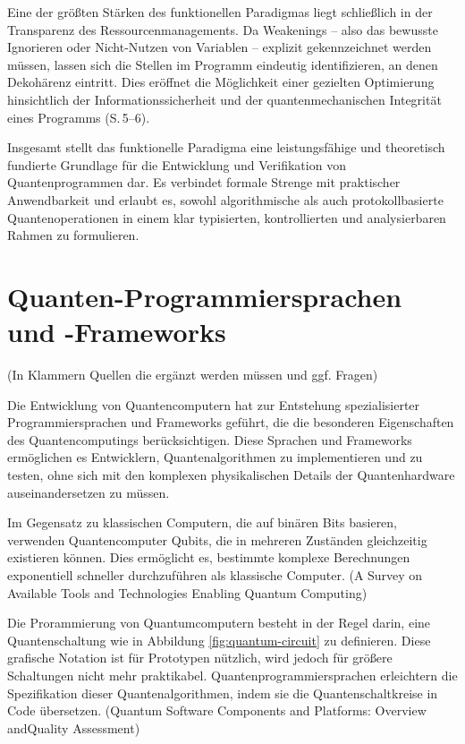Eine der größten Stärken des funktionellen Paradigmas liegt schließlich in der Transparenz des Ressourcenmanagements. Da Weakenings -- also das bewusste Ignorieren oder Nicht-Nutzen von Variablen -- explizit gekennzeichnet werden müssen, lassen sich die Stellen im Programm eindeutig identifizieren, an denen Dekohärenz eintritt. Dies eröffnet die Möglichkeit einer gezielten Optimierung hinsichtlich der Informationssicherheit und der quantenmechanischen Integrität eines Programms (S.\,5--6).

Insgesamt stellt das funktionelle Paradigma eine leistungsfähige und theoretisch fundierte Grundlage für die Entwicklung und Verifikation von Quantenprogrammen dar. Es verbindet formale Strenge mit praktischer Anwendbarkeit und erlaubt es, sowohl algorithmische als auch protokollbasierte Quantenoperationen in einem klar typisierten, kontrollierten und analysierbaren Rahmen zu formulieren.


\section{Quanten-Programmiersprachen und -Frameworks}
\label{sec:programming-languages}
(In Klammern Quellen die ergänzt werden müssen und ggf. Fragen)

Die Entwicklung von Quantencomputern hat zur Entstehung spezialisierter Programmiersprachen und Frameworks geführt, die die besonderen Eigenschaften des Quantencomputings berücksichtigen. Diese Sprachen und Frameworks ermöglichen es Entwicklern, Quantenalgorithmen zu implementieren und zu testen, ohne sich mit den komplexen physikalischen Details der Quantenhardware auseinandersetzen zu müssen. 

Im Gegensatz zu klassischen Computern, die auf binären Bits basieren, verwenden Quantencomputer Qubits, die in mehreren Zuständen gleichzeitig existieren können. Dies ermöglicht es, bestimmte komplexe Berechnungen exponentiell schneller durchzuführen als klassische Computer. (A Survey on Available Tools and Technologies Enabling Quantum Computing)

Die Prorammierung von Quantumcomputern besteht in der Regel darin, eine Quantenschaltung wie in Abbildung \ref{fig:quantum-circuit} zu definieren. 
Diese grafische Notation ist für Prototypen nützlich, wird jedoch für größere Schaltungen nicht mehr praktikabel. Quantenprogrammiersprachen erleichtern die Spezifikation dieser Quantenalgorithmen, indem sie die Quantenschaltkreise in Code übersetzen. (Quantum Software Components and Platforms: Overview andQuality Assessment)

